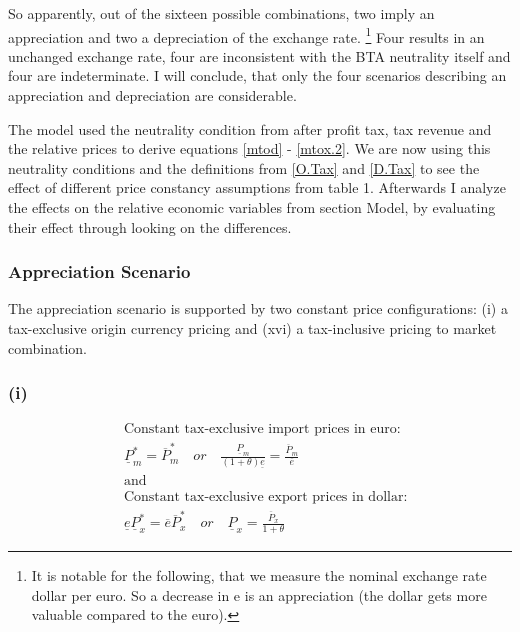So apparently, out of the sixteen possible combinations, two imply an appreciation and two a depreciation of the exchange rate. \footnote{It is notable for the following, that we measure the nominal exchange rate dollar per euro. So a decrease in e is an appreciation (the dollar gets more valuable compared to the euro).} Four results in an unchanged exchange rate, four are inconsistent with the BTA neutrality itself and four are indeterminate. 
I will conclude, that only the four scenarios describing an appreciation and depreciation are considerable.

The model used the neutrality condition from after profit tax, tax revenue and the relative prices to derive equations \eqref{mtod} - \eqref{mtox.2}. We are now using this neutrality conditions and the definitions from \eqref{O.Tax} and \eqref{D.Tax} to see the effect of different price constancy assumptions from table 1. Afterwards I analyze the effects on the relative economic variables from section Model, by evaluating their effect through looking on the differences. 

\subsubsection{Appreciation Scenario}
The appreciation scenario is supported by two constant price configurations: (i) a tax-exclusive origin currency pricing and (xvi) a tax-inclusive pricing to market combination. 
\subsubsection*{(i)}
\begin{equation}\label{i}
\begin{aligned}
&\text{Constant tax-exclusive import prices in euro:}\\ &\underline P^*_m = \overline P^*_m \quad or \quad \frac{\underline P_m}{(1+\theta)\underline e} = \frac{\overline P_m}{\overline e} \\
&\text{and}\\
&\text{Constant tax-exclusive export prices in dollar:}\\  &\underline e \underline P^*_x = \overline e \overline P^*_x \quad or \quad \underline P_x = \frac{\overline P_x}{1+\theta}
\end{aligned}
\end{equation}

